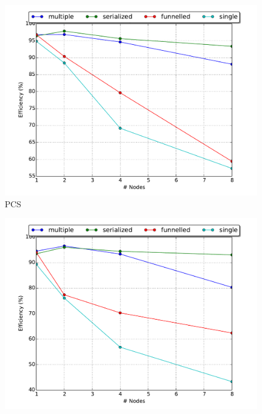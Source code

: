 \documentclass[11pt]{book}
\begin{document}
\begin{figure}
  \begin{minipage}{.5\textwidth}
    \begin{center}
      \includegraphics[width=\textwidth,keepaspectratio,quiet]{figs/partitioning_communication/communication_pcs_efficiency.pdf} \\
      PCS \\
    \end{center}
  \end{minipage}%
  \hfill
  \begin{minipage}{.5\textwidth}
    \begin{center}
      \includegraphics[width=\textwidth,keepaspectratio,quiet]{figs/partitioning_communication/communication_traffic_efficiency.pdf} \\

\end{center}
\end{minipage}
\end{figure}
\end{document}
